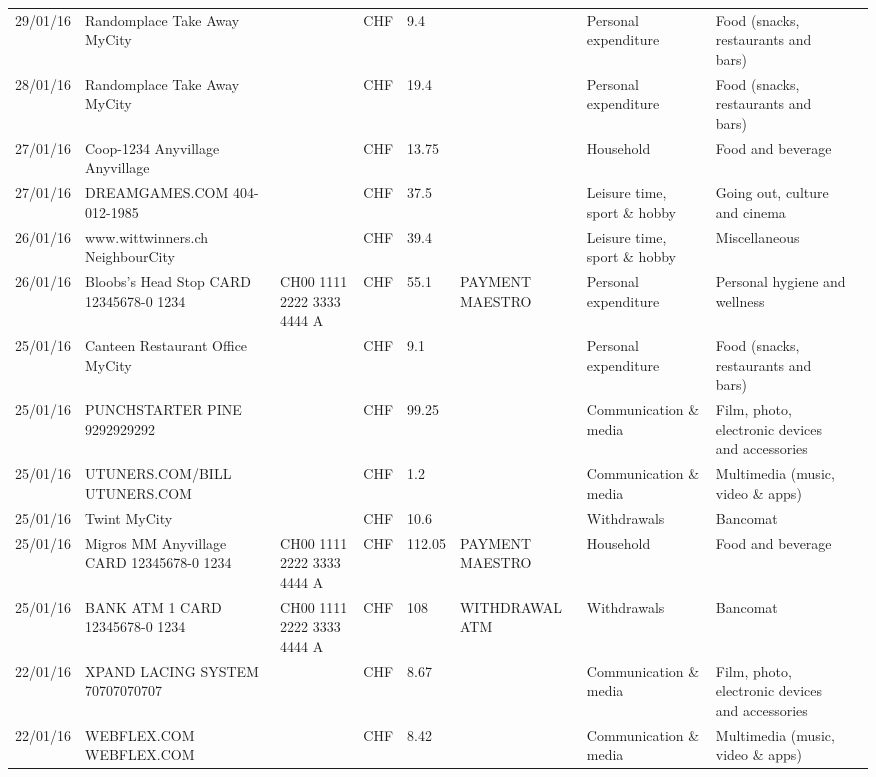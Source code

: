 \begin{landscape}
\begin{tiny}
\begin{longtable}{lp{4cm}llllp{3cm}ll}
		    29/01/16 & Randomplace Take Away     MyCity &       & CHF   & 9.4   &       & Personal expenditure & Food (snacks, restaurants and bars) \\
		    28/01/16 & Randomplace Take Away     MyCity &       & CHF   & 19.4  &       & Personal expenditure & Food (snacks, restaurants and bars) \\
		    27/01/16 & Coop-1234 Anyvillage    Anyvillage &       & CHF   & 13.75 &       & Household & Food and beverage \\
		    27/01/16 & DREAMGAMES.COM           404-012-1985 &       & CHF   & 37.5  &       & Leisure time, sport \& hobby & Going out, culture and cinema \\
		    26/01/16 & www.wittwinners.ch        NeighbourCity &       & CHF   & 39.4  &       & Leisure time, sport \& hobby & Miscellaneous \\
		    26/01/16 & Bloobs's Head Stop CARD 12345678-0 1234 & CH00 1111 2222 3333 4444 A & CHF   & 55.1  & PAYMENT MAESTRO & Personal expenditure & Personal hygiene and wellness \\
		    25/01/16 & Canteen Restaurant Office      MyCity &       & CHF   & 9.1   &       & Personal expenditure & Food (snacks, restaurants and bars) \\
		    25/01/16 & PUNCHSTARTER PINE   9292929292 &       & CHF   & 99.25 &       & Communication \& media & Film, photo, electronic devices and accessories \\
		    25/01/16 & UTUNERS.COM/BILL          UTUNERS.COM &       & CHF   & 1.2   &       & Communication \& media & Multimedia (music, video \& apps) \\
		    25/01/16 & Twint               MyCity &       & CHF   & 10.6  &       & Withdrawals & Bancomat \\
		    25/01/16 & Migros MM Anyvillage CARD 12345678-0 1234 & CH00 1111 2222 3333 4444 A & CHF   & 112.05 & PAYMENT MAESTRO & Household & Food and beverage \\
		    25/01/16 & BANK ATM 1 CARD 12345678-0 1234 & CH00 1111 2222 3333 4444 A & CHF   & 108   & WITHDRAWAL ATM & Withdrawals & Bancomat \\
		    22/01/16 & XPAND LACING SYSTEM      70707070707 &       & CHF   & 8.67  &       & Communication \& media & Film, photo, electronic devices and accessories \\
		    22/01/16 & WEBFLEX.COM              WEBFLEX.COM &       & CHF   & 8.42  &       & Communication \& media & Multimedia (music, video \& apps) \\

\end{longtable}
\end{tiny}
\end{landscape}
